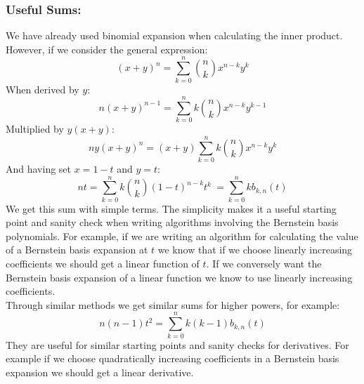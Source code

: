 \subsubsection{Useful Sums:}
We have already used binomial expansion when calculating the inner product.
However, if we consider the general expression:
\[(x+y)^n = \sum_{k=0}^n\binom{n}{k}x^{n-k}y^k\]	
When derived by $y$:
\[n(x+y)^{n-1} = \sum_{k=0}^nk\binom{n}{k}x^{n-k}y^{k-1}\]
Multiplied by $y(x+y)$:
\[ny(x+y)^n = (x+y)\sum_{k=0}^nk\binom{n}{k}x^{n-k}y^k\]
And having set $x=1-t$ and $y=t$:
\[nt = \sum_{k=0}^nk\binom{n}{k}(1-t)^{n-k}t^k\ = \sum_{k=0}^nkb_{k,n}(t)\]
We get this sum with simple terms.
The simplicity makes it a useful starting point and sanity check when writing algorithms involving the Bernstein basis polynomials.
For example,
if we are writing an algorithm for calculating the value of a Bernstein basis expansion at $t$ we know that if we choose linearly increasing coefficients we should get a linear function of $t$.
If we conversely want the Bernstein basis expansion of a linear function we know to use linearly increasing coefficients.	
\\

Through similar methods we get similar sums for higher powers, for example:
\[n(n-1)t^2 = \sum_{k=0}^nk(k-1)b_{k,n}(t)\]
They are useful for similar starting points and sanity checks for derivatives.
For example if we choose quadratically increasing coefficients in a Bernstein basis expansion we should get a linear derivative.
